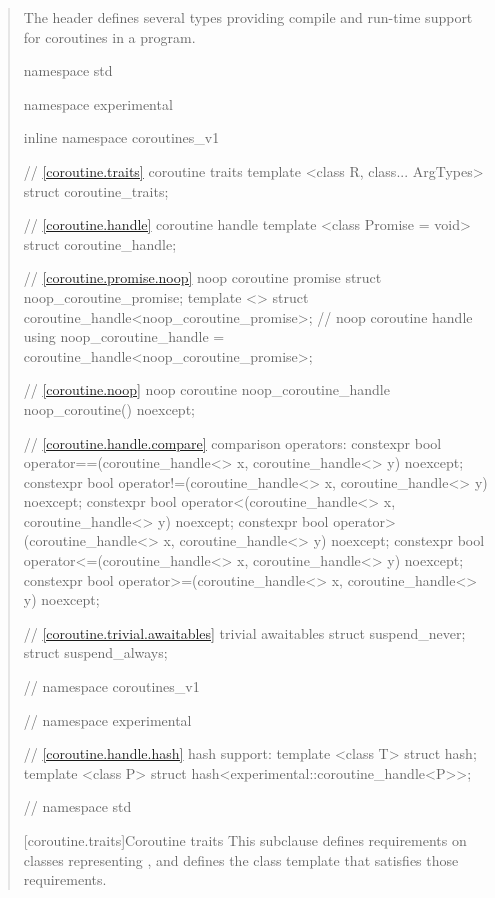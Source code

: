 \begin{quote}

\pnum
The header
defines several types providing compile and run-time support for coroutines in a \Cpp program.


%
%
\begin{codeblock}
namespace std {
namespace experimental {
inline namespace coroutines_v1 {

  // \ref{coroutine.traits} coroutine traits
  template <class R, class... ArgTypes>
    struct coroutine_traits;
  	
  // \ref{coroutine.handle} coroutine handle
  template <class Promise = void>
    struct coroutine_handle;		
  
  // \ref{coroutine.promise.noop} noop coroutine promise
  struct noop_coroutine_promise;
  template <> struct coroutine_handle<noop_coroutine_promise>;
  // noop coroutine handle
  using noop_coroutine_handle = coroutine_handle<noop_coroutine_promise>;
  
  // \ref{coroutine.noop} noop coroutine
  noop_coroutine_handle noop_coroutine() noexcept;

  // \ref{coroutine.handle.compare} comparison operators:	
  constexpr bool operator==(coroutine_handle<> x, coroutine_handle<> y) noexcept;
  constexpr bool operator!=(coroutine_handle<> x, coroutine_handle<> y) noexcept;
  constexpr bool operator<(coroutine_handle<> x, coroutine_handle<> y) noexcept;			
  constexpr bool operator>(coroutine_handle<> x, coroutine_handle<> y) noexcept;
  constexpr bool operator<=(coroutine_handle<> x, coroutine_handle<> y) noexcept;			
  constexpr bool operator>=(coroutine_handle<> x, coroutine_handle<> y) noexcept;
    
  // \ref{coroutine.trivial.awaitables} trivial awaitables
  struct suspend_never;
  struct suspend_always;
    
} // namespace coroutines_v1
} // namespace experimental

// \ref{coroutine.handle.hash} hash support:
template <class T> struct hash;
template <class P> struct hash<experimental::coroutine_handle<P>>;

} // namespace std
\end{codeblock}

[coroutine.traits]{Coroutine traits}
\pnum
This subclause defines requirements on classes representing
,
and defines the class template
that satisfies those requirements.


\end{quote}
